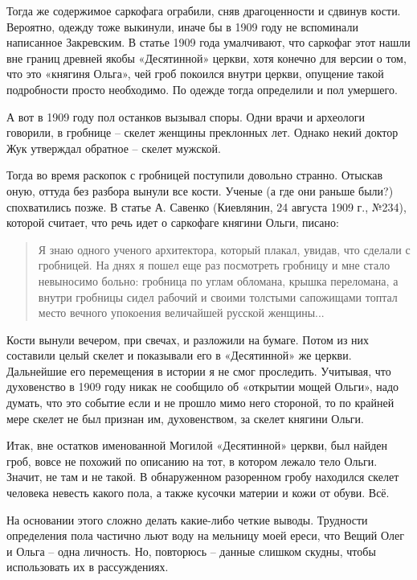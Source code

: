 Тогда же содержимое саркофага ограбили, сняв драгоценности и сдвинув кости. Вероятно, одежду тоже выкинули, иначе бы в 1909 году не вспоминали написанное Закревским. В статье 1909 года умалчивают, что саркофаг этот нашли вне границ древней якобы «Десятинной» церкви, хотя конечно для версии о том, что это «княгиня Ольга», чей гроб покоился внутри церкви, опущение такой подробности просто необходимо. По одежде тогда определили и пол умершего. 

А вот в 1909 году пол останков вызывал споры. Одни врачи и археологи говорили, в гробнице – скелет женщины преклонных лет. Однако некий доктор Жук утверждал обратное – скелет мужской.

Тогда во время раскопок с гробницей поступили довольно странно. Отыскав оную, оттуда без разбора вынули все кости. Ученые (а где они раньше были?) спохватились позже. В статье А. Савенко (Киевлянин, 24 августа 1909 г., №234), которой считает, что речь идет о саркофаге княгини Ольги, писано: 

\begin{quotation}
Я знаю одного ученого архитектора, который плакал, увидав, что сделали с гробницей. На днях я пошел еще раз посмотреть гробницу и мне стало невыносимо больно: гробница по углам обломана, крышка переломана, а внутри гробницы сидел рабочий и своими толстыми сапожищами топтал место вечного упокоения величайшей русской женщины...
\end{quotation}

Кости вынули вечером, при свечах, и разложили на бумаге. Потом из них составили целый скелет и показывали его в «Десятинной» же церкви. Дальнейшие его перемещения в истории я не смог проследить. Учитывая, что духовенство в 1909 году никак не сообщило об «открытии мощей Ольги», надо думать, что это событие если и не прошло мимо него стороной, то по крайней мере скелет не был признан им, духовенством, за скелет княгини Ольги.

Итак, вне остатков именованной Могилой «Десятинной» церкви, был найден гроб, вовсе не похожий по описанию на тот, в котором лежало тело Ольги. Значит, не там и не такой. В обнаруженном разоренном гробу находился скелет человека невесть какого пола, а также кусочки материи и кожи от обуви. Всё. 

На основании этого сложно делать какие-либо четкие выводы. Трудности определения пола частично льют воду на мельницу моей ереси, что Вещий Олег и Ольга – одна личность. Но, повторюсь – данные слишком скудны, чтобы использовать их в рассуждениях.



